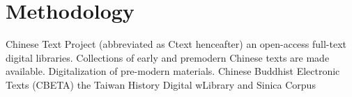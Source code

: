 
    \chapter{Methodology}%
    Chinese Text Project (abbreviated as Ctext henceafter) 
    an open-access full-text digital libraries. Collections of early and pre\-modern Chinese texts are made available. Digitalization of pre-modern materials. 
    Chinese Buddhist \cite{vanhove2008polysemy} Electronic Texts (CBETA) \cite{ctext}
    the Taiwan History Digital wLibrary  
    and Sinica Corpus 
